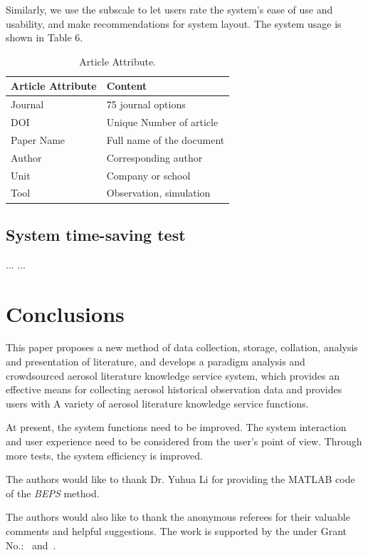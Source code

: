 Similarly, we use the subscale to let users rate the system's ease of use and usability, and make recommendations for system layout. The system usage is shown in Table 6.

\begin{table}
	\caption{Article Attribute.}
	\label{tab:freq}
	\begin{tabular}{ll}
		\toprule
		Article Attribute&Content\\
		\midrule
		Journal & 75 journal options\\
		DOI & Unique Number of article\\
		Paper Name & Full name of the document\\
		Author & Corresponding author\\
		Unit & Company or school\\
		Tool & Observation, simulation\\
		\bottomrule
	\end{tabular}
\end{table}

\subsection{System time-saving test}
... ...


\section{Conclusions}
This paper proposes a new method of data collection, storage, collation, analysis and presentation of literature, and develops a paradigm analysis and crowdsourced aerosol literature knowledge service system, which provides an effective means for collecting aerosol historical observation data and provides users with A variety of aerosol literature knowledge service functions.

At present, the system functions need to be improved. The system interaction and user experience need to be considered from the user's point of view. Through more tests, the system efficiency is improved.


\begin{acks}
	The authors would like to thank Dr. Yuhua Li for providing the
	MATLAB code of the \textit{BEPS} method.
	
	The authors would also like to thank the anonymous referees for
	their valuable comments and helpful suggestions. The work is
	supported by the  under Grant
	No.:~
	and~.
	
\end{acks}
